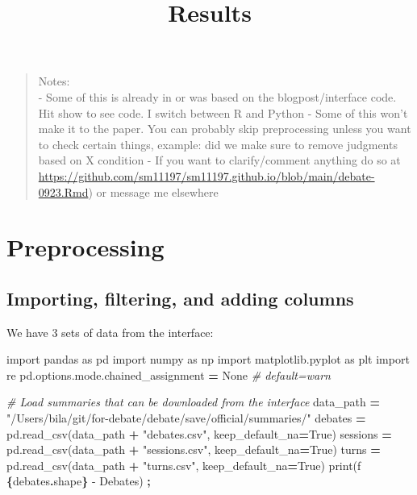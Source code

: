 \documentclass[
]{article}
\title{Results}
\author{}
\date{\vspace{-2.5em}}
\newenvironment{Shaded}{\begin{snugshade}}{\end{snugshade}}
\newcommand{\BuiltInTok}[1]{#1}
\newcommand{\CommentTok}[1]{\textcolor[rgb]{0.56,0.35,0.01}{\textit{#1}}}
\newcommand{\ImportTok}[1]{#1}
\newcommand{\NormalTok}[1]{#1}
\newcommand{\OperatorTok}[1]{\textcolor[rgb]{0.81,0.36,0.00}{\textbf{#1}}}
\newcommand{\SpecialCharTok}[1]{\textcolor[rgb]{0.81,0.36,0.00}{\textbf{#1}}}
\newcommand{\SpecialStringTok}[1]{\textcolor[rgb]{0.31,0.60,0.02}{#1}}
\newcommand{\StringTok}[1]{\textcolor[rgb]{0.31,0.60,0.02}{#1}}
\newcommand{\VariableTok}[1]{\textcolor[rgb]{0.00,0.00,0.00}{#1}}
\begin{document}
\maketitle

\begin{quote}
Notes:\\
- Some of this is already in or was based on the blogpost/interface
code. Hit show to see code. I switch between R and Python - Some of this
won't make it to the paper. You can probably skip preprocessing unless
you want to check certain things, example: did we make sure to remove
judgments based on X condition - If you want to clarify/comment anything
do so at
\url{https://github.com/sm11197/sm11197.github.io/blob/main/debate-0923.Rmd})
or message me elsewhere
\end{quote}

\section{Preprocessing}\label{preprocessing}

\subsection{Importing, filtering, and adding
columns}\label{importing-filtering-and-adding-columns}

We have 3 sets of data from the interface:

\begin{Shaded}
\begin{Highlighting}[]
\ImportTok{import}\NormalTok{ pandas }\ImportTok{as}\NormalTok{ pd}
\ImportTok{import}\NormalTok{ numpy }\ImportTok{as}\NormalTok{ np}
\ImportTok{import}\NormalTok{ matplotlib.pyplot }\ImportTok{as}\NormalTok{ plt}
\ImportTok{import}\NormalTok{ re}
\NormalTok{pd.options.mode.chained\_assignment }\OperatorTok{=} \VariableTok{None}  \CommentTok{\# default=\textquotesingle{}warn\textquotesingle{}}

\CommentTok{\# Load summaries that can be downloaded from the interface}
\NormalTok{data\_path }\OperatorTok{=} \StringTok{"/Users/bila/git/for{-}debate/debate/save/official/summaries/"}
\NormalTok{debates }\OperatorTok{=}\NormalTok{ pd.read\_csv(data\_path }\OperatorTok{+} \StringTok{"debates.csv"}\NormalTok{, keep\_default\_na}\OperatorTok{=}\VariableTok{True}\NormalTok{)}
\NormalTok{sessions }\OperatorTok{=}\NormalTok{ pd.read\_csv(data\_path }\OperatorTok{+} \StringTok{"sessions.csv"}\NormalTok{, keep\_default\_na}\OperatorTok{=}\VariableTok{True}\NormalTok{)}
\NormalTok{turns }\OperatorTok{=}\NormalTok{ pd.read\_csv(data\_path }\OperatorTok{+} \StringTok{"turns.csv"}\NormalTok{, keep\_default\_na}\OperatorTok{=}\VariableTok{True}\NormalTok{)}
\BuiltInTok{print}\NormalTok{(}\SpecialStringTok{f\textquotesingle{} }\SpecialCharTok{\{}\NormalTok{debates}\SpecialCharTok{.}\NormalTok{shape}\SpecialCharTok{\}}\SpecialStringTok{ {-} Debates\textquotesingle{}}\NormalTok{) }\OperatorTok{;}
\end{Highlighting}
\end{Shaded}
\end{document}
